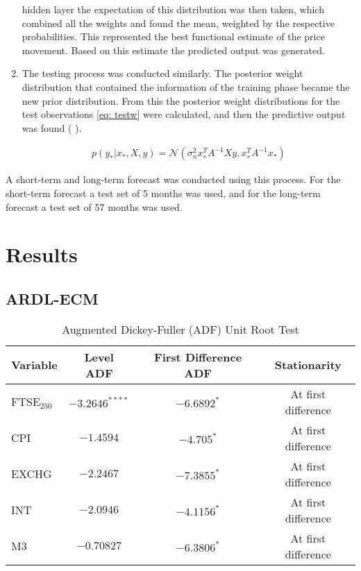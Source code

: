 \documentclass[11pt,a4paper]{article}
\newcommand{\citeboth}[1]{\citeauthor{#1} \citep{#1}}
\begin{document}
\begin{enumerate}
    hidden layer the expectation of this distribution was then taken, which
    combined all the weights and found the mean, weighted by the 
    respective probabilities. This represented the best functional estimate of the price movement. Based on this estimate 
    the predicted output was generated.
    \item The testing process was conducted similarly. The 
    posterior weight distribution that contained the information of the training phase became the new 
    prior distribution. From this the posterior weight distributions for the test observations \eqref{eq: testw}
    were calculated, and then the predictive output was found (\citeboth{rasmussen2006}).
    
    \begin{align}
        p(y_{*}|x_{*}, X, y) = \mathcal{N}(\sigma_{n}^{2} x_{*}^{T}A^{-1}Xy, x_{*}^{T}A^{-1}x_{*}) \label{eq: testw}
    \end{align}
\end{enumerate}

A short-term and long-term forecast was conducted using this process. For the short-term forecast a test set of 5 months was used, and for the long-term forecast a test set of 57 months was used.


\section{Results}
\label{sec: results}

\subsection{ARDL-ECM}

\begin{table}[h!]
    \centering
    \label{table: unitroot}
    \caption{Augmented Dickey-Fuller (ADF) Unit Root Test}
    \begin{tabular}{lccc}
        \toprule
        \textbf{Variable} & \textbf{Level ADF} & \textbf{First Difference ADF} & \textbf{Stationarity} \\
        \midrule
        FTSE$_{250}$ & $-3.2646^{****}$ & $-6.6892^{*}$ & At first difference \\
        CPI          & $-1.4594$ & $-4.705^{*}$ & At first difference \\
        EXCHG        & $-2.2467$ & $-7.3855^{*}$ & At first difference \\
        INT          & $-2.0946$ & $-4.1156^{*}$ & At first difference \\
        M3           & $-0.70827$ & $-6.3806^{*}$ & At first difference \\
        \bottomrule
    \end{tabular}
\end{table}
\end{document}
